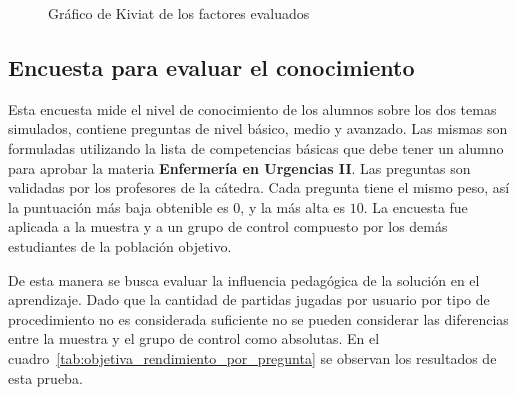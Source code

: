 \begin{figure}
\centering
{}
\label{fig:subjetiva_kiviat}
\caption{Gráfico de Kiviat de los factores evaluados}
\end{figure}

\subsection{Encuesta para evaluar el conocimiento}

Esta encuesta mide el nivel de conocimiento de los alumnos sobre los dos temas 
simulados, contiene preguntas de nivel básico, medio y avanzado. Las mismas 
son formuladas utilizando la lista de competencias básicas que debe tener un 
alumno para aprobar la materia \textbf{Enfermería en Urgencias II}. Las 
preguntas son validadas  por los profesores de la cátedra. Cada pregunta 
tiene el mismo peso, así la puntuación más baja obtenible es $0$, y la más 
alta es $10$. La encuesta fue aplicada a la muestra y a un grupo de control 
compuesto por los demás estudiantes de la población objetivo.

De esta manera se busca evaluar la influencia pedagógica  de la solución en el
aprendizaje. Dado que la cantidad de partidas jugadas por usuario por tipo de
procedimiento no es considerada suficiente no se pueden considerar las
diferencias entre la muestra y el grupo de control como absolutas. En el
cuadro~\ref{tab:objetiva_rendimiento_por_pregunta} se observan los resultados de esta prueba.

